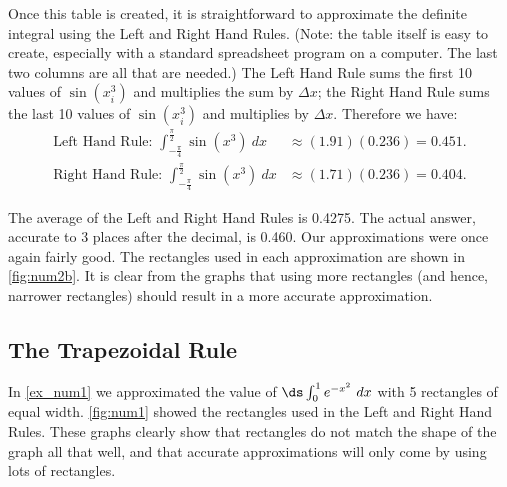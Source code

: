 {Once this table is created, it is straightforward to approximate the definite integral using the Left and Right Hand Rules. (Note: the table itself is easy to create, especially with a standard spreadsheet program on a computer. The last two columns are all that are needed.) The Left Hand Rule sums the first 10 values of $\sin(x_i^3)$ and multiplies the sum by $\Delta x$; the Right Hand Rule sums the last 10 values of $\sin(x_i^3)$ and multiplies by $\Delta x$. Therefore we have:
\begin{align*}
	\text{Left Hand Rule: }\int_{-\frac{\pi}4}^{\frac{\pi}2}\sin(x^3)\ dx
	& \approx (1.91)(0.236) = 0.451. \\
	\text{Right Hand Rule: }\int_{-\frac{\pi}4}^{\frac{\pi}2}\sin(x^3)\ dx
	&\approx (1.71)(0.236) = 0.404.
\end{align*}

The average of the Left and Right Hand Rules is 0.4275.  The actual answer, accurate to 3 places after the decimal, is 0.460. Our approximations were once again fairly good. The rectangles used in each approximation are shown in \autoref{fig:num2b}. It is clear from the graphs that using more rectangles (and hence, narrower rectangles) should result in a more accurate approximation.}

\subsection{The Trapezoidal Rule}

In \autoref{ex_num1} we approximated the value of $\ds \int_0^1 e^{-x^2}\ dx$ with 5 rectangles of equal width. \autoref{fig:num1} showed the rectangles used in the Left and Right Hand Rules. These graphs clearly show that rectangles do not match the shape of the graph all that well, and that accurate approximations will only come by using lots of rectangles. 



